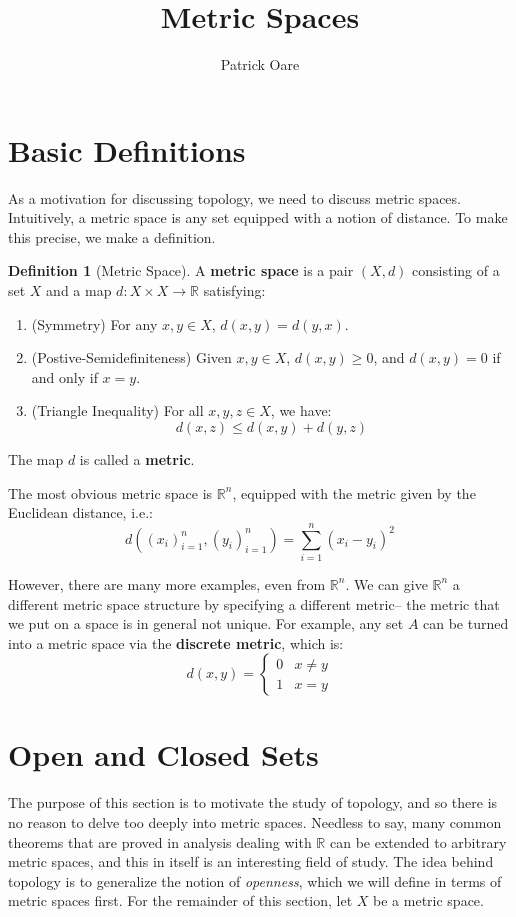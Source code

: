 \documentclass[11pt, oneside]{amsart}   	%
\title{Metric Spaces}
\author{Patrick Oare}
\date{}							%
\theoremstyle{definition}
\newtheorem{definition}{Definition}[section]
\begin{document}
\maketitle

\section{Basic Definitions}

	As a motivation for discussing topology, we need to discuss metric spaces. Intuitively, a metric space is any set equipped with a notion of distance. To make 
	this precise, we make a definition.
	
	\begin{definition}[Metric Space]
		A \textbf{metric space} is a pair $(X, d)$ consisting of a set $X$ and a map $d : X\times X\rightarrow\mathbb R$ satisfying:
		\begin{enumerate}
			\item (Symmetry) For any $x, y\in X$, $d(x, y) = d(y, x)$.
			\item (Postive-Semidefiniteness) Given $x, y\in X$, $d(x, y) \geq 0$, and $d(x, y) = 0$ if and only if $x = y$.
			\item (Triangle Inequality) For all $x, y, z\in X$, we have:
			$$
				d(x, z)\leq d(x, y) + d(y, z)
			$$
		\end{enumerate}
		The map $d$ is called a \textbf{metric}.
	\end{definition}
	
	The most obvious metric space is $\mathbb R^n$, equipped with the metric given by the Euclidean distance, i.e.:
	$$
		d((x_i)_{i = 1}^n, (y_i)_{i = 1}^n) = \sum_{i = 1}^n (x_i - y_i)^2
	$$
	
	However, there are many more examples, even from $\mathbb R^n$. We can give $\mathbb R^n$ a different metric space structure by specifying a 
	different metric-- the metric that we put on a space is in general not unique. For example, any set $A$ can be turned into a metric space via the 
	\textbf{discrete metric}, which is:
	$$
		d(x, y) = 
		\begin{cases}
			0 & x\neq y \\
			1 & x = y
		\end{cases}
	$$
	
\section{Open and Closed Sets}
	
	The purpose of this section is to motivate the study of topology, and so there is no reason to delve too deeply into metric spaces. Needless to say, many 
	common theorems that are proved in analysis dealing with $\mathbb R$ can be extended to arbitrary metric spaces, and this in itself is an interesting field 
	of study. The idea behind topology is to generalize the notion of \textit{openness}, which we will define in terms of metric spaces first. For the remainder 
	of this section, let $X$ be a metric space.
	
\end{document}
